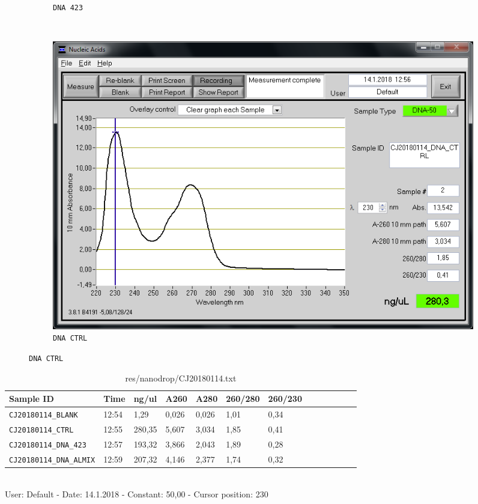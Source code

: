 \begin{figure}[H]
\begin{subfigure}[b]{0.3\textwidth}
        \caption{\texttt{DNA 423}}
        \label{sfig:CJ20180114_DNA_423}
    \end{subfigure}
    ~
    \begin{subfigure}[b]{0.3\textwidth}
        \includegraphics[width=\textwidth]{graphics/screenshots/CJ20180114_DNA_CTRL.png}
        \caption{\texttt{DNA CTRL}}
        \label{sfig:CJ20180114_DNA_CTRL}
    \end{subfigure}
\end{figure}

\begin{table}[htbp]
\caption{res/nanodrop/CJ20180114.txt}
\label{tab:CJ20180114}
\centering
\begin{tabular}{l l l l l l l l l l l l l }
\toprule
Sample ID & Time  & ng/ul  & A260  & A280  & 260/280  & 260/230  \\ \midrule
\texttt{CJ20180114\_BLANK} & 12:54 & 1,29 & 0,026 & 0,026 & 1,01 & 0,34 \\
\texttt{CJ20180114\_CTRL} & 12:55 & 280,35 & 5,607 & 3,034 & 1,85 & 0,41 \\
\texttt{CJ20180114\_DNA\_423} & 12:57 & 193,32 & 3,866 & 2,043 & 1,89 & 0,28 \\
\texttt{CJ20180114\_DNA\_ALMIX} & 12:59 & 207,32 & 4,146 & 2,377 & 1,74 & 0,32 \\
\bottomrule
\end{tabular}
\\
User: Default - Date: 14.1.2018 - Constant: 50,00 - Cursor position: 230 \
\end{table}